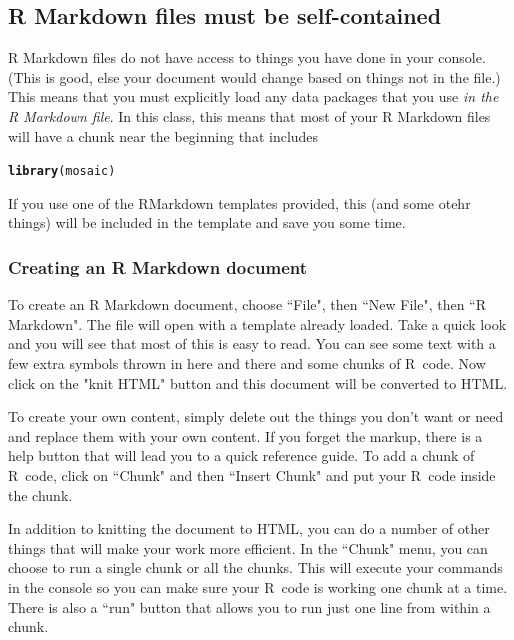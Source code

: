 \documentclass[twoside]{book}\usepackage[]{graphicx}\usepackage[]{xcolor}
\makeatletter
\newcommand{\hlstd}[1]{\textcolor[rgb]{0.345,0.345,0.345}{#1}}%
\newcommand{\hlkwd}[1]{\textcolor[rgb]{0.737,0.353,0.396}{\textbf{#1}}}%
\newenvironment{kframe}{%
 \def\at@end@of@kframe{}%
 \ifinner\ifhmode%
  \def\at@end@of@kframe{\end{minipage}}%
  \begin{minipage}{\columnwidth}%
 \fi\fi%
 \def\FrameCommand##1{\hskip\@totalleftmargin \hskip-\fboxsep
 \colorbox{shadecolor}{##1}\hskip-\fboxsep
     \hskip-\linewidth \hskip-\@totalleftmargin \hskip\columnwidth}%
 \MakeFramed {\advance\hsize-\width
   \@totalleftmargin\z@ \linewidth\hsize
   \@setminipage}}%
 {\par\unskip\endMakeFramed%
 \at@end@of@kframe}
\newenvironment{knitrout}{}{} %
\def\R{{\sf R}}
\makeatother
\begin{document}

\subsection*{R Markdown files must be self-contained}
R Markdown files do not have access to things you have done in your console.  (This is good, else 
your document would change based on things not in the file.)  This means that you must explicitly
load any data packages that you use \emph{in the R Markdown file}. In this class,
this means that most of your R Markdown files will have a chunk near the beginning that 
includes

\begin{knitrout}
\color{fgcolor}\begin{kframe}
\begin{alltt}
\hlkwd{library}\hlstd{(mosaic)}
\end{alltt}
\end{kframe}
\end{knitrout}

\noindent
If you use one of the RMarkdown templates provided, 
this (and some otehr things) will be included in the template and save you some time.

\iffalse
\subsubsection{Creating an R Markdown document}
To create an R Markdown document, choose ``File", then ``New File", then ``R Markdown".  The file
will open with a template already loaded.   Take a quick look and you will see that most 
of this is easy to read.  You can see some text with a few extra symbols thrown in here and 
there and some chunks of \R\ code.
Now click on the "knit HTML" button and this document will be converted to HTML.

To create your own content, simply delete out the things you don't want or need
and replace them with your own content.  If you forget the markup, there is a help button
that will lead you to a quick reference guide.  To add a chunk of \R\ code, click on 
``Chunk" and then ``Insert Chunk" and put your \R\ code inside the chunk.

In addition to knitting the document to HTML, you can do a number of other things that will
make your work more efficient.  In the ``Chunk" menu, you can choose to run a single chunk 
or all the chunks.  This will execute your commands in the console so you can make sure 
your \R\ code is working one chunk at a time.  There is also a ``run" button that allows you
to run just one line from within a chunk.
\end{document}
